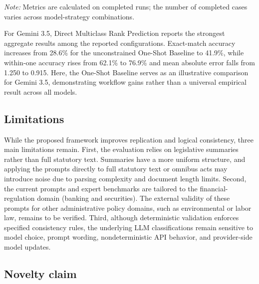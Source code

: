 \documentclass[conference]{IEEEtran}
\begin{document}
\begin{table}[t]
\begin{threeparttable}
\begin{tablenotes}
\scriptsize
\item[] \textit{Note:} Metrics are calculated on completed runs; the number of completed cases varies across model-strategy combinations.
\end{tablenotes}

\end{threeparttable}
\end{table}


For Gemini 3.5, Direct Multiclass Rank Prediction reports the strongest aggregate results among the reported configurations. Exact-match accuracy increases from 28.6\% for the unconstrained One-Shot Baseline to 41.9\%, while within-one accuracy rises from 62.1\% to 76.9\% and mean absolute error falls from 1.250 to 0.915. Here, the One-Shot Baseline serves as an illustrative comparison for Gemini 3.5, demonstrating workflow gains rather than a universal empirical result across all models.



\subsection{Limitations}

While the proposed framework improves replication and logical consistency, three main limitations remain. First, the evaluation relies on legislative summaries rather than full statutory text. Summaries have a more uniform structure, and applying the prompts directly to full statutory text or omnibus acts may introduce noise due to parsing complexity and document length limits. Second, the current prompts and expert benchmarks are tailored to the financial-regulation domain (banking and securities). The external validity of these prompts for other administrative policy domains, such as environmental or labor law, remains to be verified. Third, although deterministic validation enforces specified consistency rules, the underlying LLM classifications remain sensitive to model choice, prompt wording, nondeterministic API behavior, and provider-side model updates.

\subsection{Novelty claim}
\end{document}
